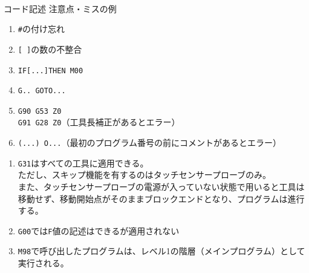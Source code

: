 \begin{appendices}
\clearpage
~\vfill
\begin{Column}{コード記述 注意点・ミスの例}
\begin{enumerate}
\item \verb|#|\hx の付け忘れ
\item \verb|[ ]|の数の不整合
\item \verb|IF[...]THEN M00|
\item \verb|G.. GOTO...|
\item \verb|G90 G53 Z0|\\
      \verb|G91 G28 Z0|（工具長補正があるとエラー）
\item \verb|(...) O...|（最初のプログラム番号の前にコメントがあるとエラー）
\end{enumerate}
\tcbline*
\begin{enumerate}
\item
\verb|G31|はすべての工具に適用できる。\\
ただし、スキップ機能を有するのはタッチセンサープローブのみ。\\
また、タッチセンサープローブの電源が入っていない状態で用いると工具は移動せず、移動開始点がそのままブロックエンドとなり、プログラムは進行する。
\item \verb|G00|では\verb|F|値の記述はできるが適用されない
\item \verb|M98|で呼び出したプログラムは、レベル1の階層（メインプログラム）として実行される。
\end{enumerate}
\end{Column}

\end{appendices}
\clearrightpage